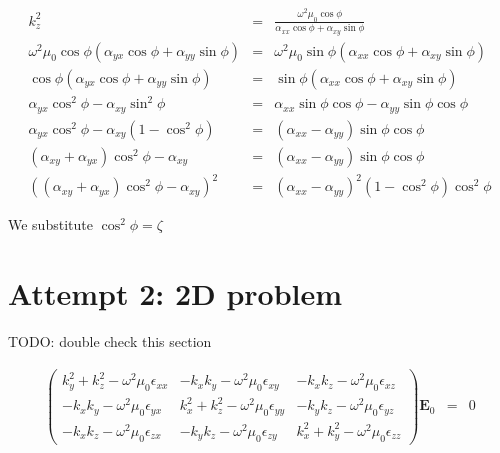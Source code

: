 \documentclass[12pt,a4paper,twoside,openright,BCOR10mm,headsepline,titlepage,abstracton,chapterprefix,final]{scrreprt}
\newcommand\Vector[1]{{\mathbf{#1}}}
\newcommand\vacuum{0}
\newcommand\wavenumber{k}
\newcommand\scalarEfield{E}
\newcommand\Efield{\Vector{\scalarEfield}}
\newcommand\vacuumpermeability{\mu_{\vacuum}}
\newcommand\scalarpermittivity{\epsilon}
\begin{document}
\begin{eqnarray}
 \wavenumber_z^2 &=& \frac{ \omega^2 \mu_0 \cos \phi}{\alpha_{xx} \cos \phi + \alpha_{xy} \sin \phi}\\ 
 \omega^2 \mu_0 \cos \phi (\alpha_{yx} \cos \phi + \alpha_{yy} \sin \phi) &=& \omega^2 \mu_0 \sin \phi (\alpha_{xx} \cos \phi + \alpha_{xy} \sin \phi) \\
 \cos \phi (\alpha_{yx} \cos \phi + \alpha_{yy} \sin \phi) &=& \sin \phi (\alpha_{xx} \cos \phi + \alpha_{xy} \sin \phi) \\
 \alpha_{yx} \cos^2 \phi - \alpha_{xy} \sin^2 \phi &=& \alpha_{xx} \sin \phi \cos \phi - \alpha_{yy} \sin \phi \cos \phi \\
 \alpha_{yx} \cos^2 \phi - \alpha_{xy} ( 1- \cos^2 \phi ) &=& ( \alpha_{xx} - \alpha_{yy} ) \sin \phi \cos \phi \\
 ( \alpha_{xy} + \alpha_{yx} ) \cos^2 \phi - \alpha_{xy} &=& ( \alpha_{xx} - \alpha_{yy} ) \sin \phi \cos \phi \\
 \left( ( \alpha_{xy} + \alpha_{yx} ) \cos^2 \phi - \alpha_{xy}\right)^2 &=& ( \alpha_{xx} - \alpha_{yy} )^2 (1- \cos^2 \phi) \cos^2 \phi
\end{eqnarray}

We substitute $\cos^2 \phi = \zeta$





\section{Attempt 2: 2D problem}
TODO: double check this section

\begin{eqnarray}
\begin{pmatrix}
 \wavenumber_y^2 + \wavenumber_z^2 - \omega^2 \vacuumpermeability \scalarpermittivity_{xx} 
 &
 - \wavenumber_x \wavenumber_y - \omega^2 \vacuumpermeability \scalarpermittivity_{xy}
 &
 - \wavenumber_x \wavenumber_z - \omega^2 \vacuumpermeability \scalarpermittivity_{xz}
 \\
 - \wavenumber_x \wavenumber_y - \omega^2 \vacuumpermeability \scalarpermittivity_{yx}
 &
 \wavenumber_x^2 + \wavenumber_z^2 - \omega^2 \vacuumpermeability \scalarpermittivity_{yy} 
 &
 - \wavenumber_y \wavenumber_z - \omega^2 \vacuumpermeability \scalarpermittivity_{yz}
 \\
 - \wavenumber_x \wavenumber_z - \omega^2 \vacuumpermeability \scalarpermittivity_{zx}
 &
 - \wavenumber_y \wavenumber_z - \omega^2 \vacuumpermeability \scalarpermittivity_{zy}
 &
 \wavenumber_x^2 + \wavenumber_y^2 - \omega^2 \vacuumpermeability \scalarpermittivity_{zz}  
\end{pmatrix}
\Efield_0
&=& 0 \label{eq:generalDispersionEigenEquation}
\end{eqnarray}
\end{document}
